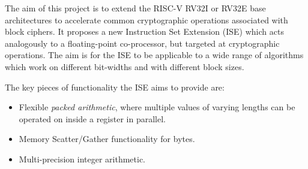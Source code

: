 

The aim of this project is to
extend the RISC-V RV32I or RV32E base architectures to
accelerate common cryptographic
operations associated with block ciphers.
It proposes a new Instruction Set Extension (ISE)
which acts analogously to a floating-point co-processor,
but targeted at cryptographic operations.
The aim is for the ISE to be applicable to a wide range of algorithms
which work on different bit-widths and with different block sizes.

The key pieces of functionality the ISE aims to provide are:

\begin{itemize}
\item Flexible {\em packed arithmetic}, where multiple values of varying
    lengths can be operated on inside a register in parallel.
\item Memory Scatter/Gather functionality for bytes.
\item Multi-precision integer arithmetic.
\end{itemize}
